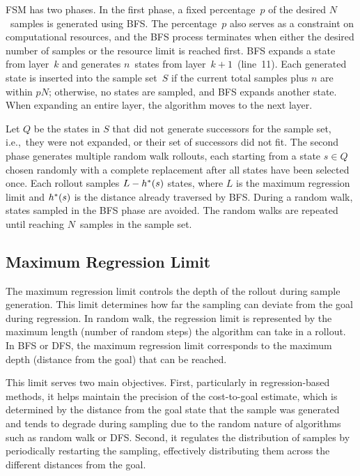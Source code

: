 FSM has two phases. In the first phase, a fixed percentage~$p$ of the desired $N$~samples is generated using BFS. The percentage~$p$ also serves as a constraint on computational resources, and the BFS process terminates when either the desired number of samples or the resource limit is reached first. BFS expands a state from layer~$k$ and generates $n$~states from layer~$k+1$~(line~11). Each generated state is inserted into the sample set~$S$ if the current total samples plus $n$ are within $pN$; otherwise, no states are sampled, and BFS expands another state. When expanding an entire layer, the algorithm moves to the next layer.

Let $Q$ be the states in $S$ that did not generate successors for the sample set, i.e.,~they were not expanded, or their set of successors did not fit. The second phase generates multiple random walk rollouts, each starting from a state $s \in Q$ chosen randomly with a complete replacement after all states have been selected once. Each rollout samples $L-h^{*}(s)$ states, where $L$ is the maximum regression limit and $h^{*}(s)$ is the distance already traversed by BFS. During a random walk, states sampled in the BFS phase are avoided. The random walks are repeated until reaching $N$~samples in the sample set.

\subsection{Maximum Regression Limit}
\label{sec:rollout-limit}

The maximum regression limit controls the depth of the rollout during sample generation. This limit determines how far the sampling can deviate from the goal during regression. In random walk, the regression limit is represented by the maximum length (number of random steps) the algorithm can take in a rollout. In BFS or DFS, the maximum regression limit corresponds to the maximum depth (distance from the goal) that can be reached.

This limit serves two main objectives. First, particularly in regression-based methods, it helps maintain the precision of the cost-to-goal estimate, which is determined by the distance from the goal state that the sample was generated and tends to degrade during sampling due to the random nature of algorithms such as random walk or DFS. Second, it regulates the distribution of samples by periodically restarting the sampling, effectively distributing them across the different distances from the goal.

